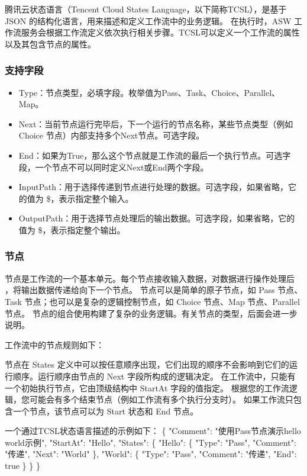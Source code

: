 腾讯云状态语言（Tencent Cloud States Language，以下简称TCSL），是基于 JSON 的结构化语言，用来描述和定义工作流中的业务逻辑。
在执行时，ASW 工作流服务会根据工作流定义依次执行相关步骤。TCSL可以定义一个工作流的属性以及其包含节点的属性。

\subsubsection{支持字段}

\begin{itemize}
    \item Type：节点类型，必填字段。枚举值为Pass、Task、Choice、Parallel、Map。
    \item Next：当前节点运行完毕后，下一个运行的节点名称，某些节点类型（例如 Choice 节点）内部支持多个Next节点。可选字段。
    \item End：如果为True，那么这个节点就是工作流的最后一个执行节点。可选字段，一个节点不可以同时定义Next或End两个字段。
    \item InputPath：用于选择传递到节点进行处理的数据。可选字段，如果省略，它的值为 \$，表示指定整个输入。
    \item OutputPath：用于选择节点处理后的输出数据。可选字段，如果省略，它的值为 \$，表示指定整个输出。
\end{itemize}

\subsubsection{节点}
节点是工作流的一个基本单元\cite{jyrq}。每个节点接收输入数据，对数据进行操作处理后 ，将输出数据传递给向下一个节点。
节点可以是简单的原子节点，如 Pass 节点、Task 节点；也可以是复杂的逻辑控制节点，如 Choice 节点、Map 节点、Parallel 节点。
节点的组合使用构建了复杂的业务逻辑。有关节点的类型，后面会进一步说明。

工作流中的节点规则如下：

节点在 States 定义中可以按任意顺序出现，它们出现的顺序不会影响到它们的运行顺序。运行顺序由节点的 Next 字段所构成的逻辑决定。
在工作流中，只能有一个初始执行节点，它由顶级结构中 StartAt 字段的值指定\cite{jysrv6}。
根据您的工作流逻辑，您可能会有多个结束节点（例如工作流有多个执行分支时）。
如果工作流只包含一个节点，该节点可以为 Start 状态和 End 节点。



一个通过TCSL状态语言描述的示例如下：
\{
    "Comment": "使用Pass节点演示hello world示例",
    "StartAt": "Hello",
    "States": \{
    "Hello": \{
        "Type": "Pass",
        "Comment": "传递",
        "Next": "World"
    \},
    "World": \{
        "Type": "Pass",
        "Comment": "传递",
        "End": true
    \}
\}
\}

